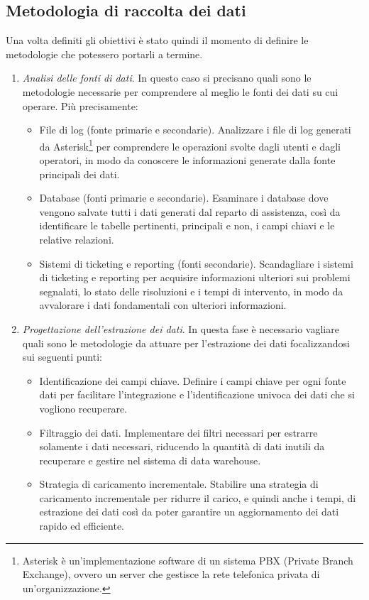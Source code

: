 \subsection{Metodologia di raccolta dei dati}
Una volta definiti gli obiettivi è stato quindi il momento di definire le metodologie che potessero portarli a termine.
\begin{enumerate}
    \item \textit{Analisi delle fonti di dati}. In questo caso si precisano quali sono le metodologie necessarie per comprendere al meglio le fonti dei dati su cui operare. Più precisamente:
    \begin{itemize}
        \item File di log (fonte primarie e secondarie). Analizzare i file di log generati da Asterisk\footnote{Asterisk è un'implementazione software di un sistema PBX (Private Branch Exchange), ovvero un server che gestisce la rete telefonica privata di un'organizzazione.} per comprendere le operazioni svolte dagli utenti e dagli operatori, in modo da conoscere le informazioni generate dalla fonte principali dei dati.
        \item Database (fonti primarie e secondarie). Esaminare i database dove vengono salvate tutti i dati generati dal reparto di assistenza, così da identificare le tabelle pertinenti, principali e non, i campi chiavi e le relative relazioni.
        \item Sistemi di ticketing e reporting (fonti secondarie). Scandagliare i sistemi di ticketing e reporting per acquisire informazioni ulteriori sui problemi segnalati, lo stato delle risoluzioni e i tempi di intervento, in modo da avvalorare i dati fondamentali con ulteriori informazioni.
    \end{itemize}
    \item \textit{Progettazione dell'estrazione dei dati}. In questa fase è necessario vagliare quali sono le metodologie da attuare per l'estrazione dei dati focalizzandosi sui seguenti punti:
    \begin{itemize}
        \item Identificazione dei campi chiave. Definire i campi chiave per ogni fonte dati per facilitare l'integrazione e l'identificazione univoca dei dati che si vogliono recuperare.
        \item Filtraggio dei dati. Implementare dei filtri necessari per estrarre solamente i dati necessari, riducendo la quantità di dati inutili da recuperare e gestire nel sistema di data warehouse.
        \item Strategia di caricamento incrementale. Stabilire una strategia di caricamento incrementale per ridurre il carico, e quindi anche i tempi, di estrazione dei dati così da poter garantire un aggiornamento dei dati rapido ed efficiente.

\end{itemize}
\end{enumerate}
